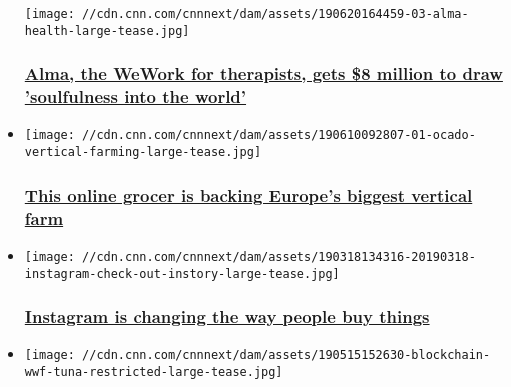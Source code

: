 \begin{itemize}
  \texttt{[image: //cdn.cnn.com/cnnnext/dam/assets/190620164459-03-alma-health-large-tease.jpg]}

  \hypertarget{alma-the-wework-for-therapists-gets-8-million-to-draw-soulfulness-into-the-world}{%
  \subsubsection{\texorpdfstring{\href{/2019/06/21/tech/alma-mental-health/index.html}{Alma,
  the WeWork for therapists, gets \$8 million to draw 'soulfulness into
  the
  world'}}{Alma, the WeWork for therapists, gets \$8 million to draw 'soulfulness into the world'}}\label{alma-the-wework-for-therapists-gets-8-million-to-draw-soulfulness-into-the-world}}
\item
  \href{/2019/06/10/business/ocado-vertical-farming/index.html}{}

  \texttt{[image: //cdn.cnn.com/cnnnext/dam/assets/190610092807-01-ocado-vertical-farming-large-tease.jpg]}

  \hypertarget{this-online-grocer-is-backing-europes-biggest-vertical-farm}{%
  \subsubsection{\texorpdfstring{\href{/2019/06/10/business/ocado-vertical-farming/index.html}{This
  online grocer is backing Europe's biggest vertical
  farm}}{This online grocer is backing Europe's biggest vertical farm}}\label{this-online-grocer-is-backing-europes-biggest-vertical-farm}}
\item
  \href{/2019/08/03/business/instagram-shopping-checkout/index.html}{}

  \texttt{[image: //cdn.cnn.com/cnnnext/dam/assets/190318134316-20190318-instagram-check-out-instory-large-tease.jpg]}

  \hypertarget{instagram-is-changing-the-way-people-buy-things}{%
  \subsubsection{\texorpdfstring{\href{/2019/08/03/business/instagram-shopping-checkout/index.html}{Instagram
  is changing the way people buy
  things}}{Instagram is changing the way people buy things}}\label{instagram-is-changing-the-way-people-buy-things}}
\item
  \href{/2019/06/05/business/blockchain-traceability/index.html}{}

  \texttt{[image: //cdn.cnn.com/cnnnext/dam/assets/190515152630-blockchain-wwf-tuna-restricted-large-tease.jpg]}


\end{itemize}
